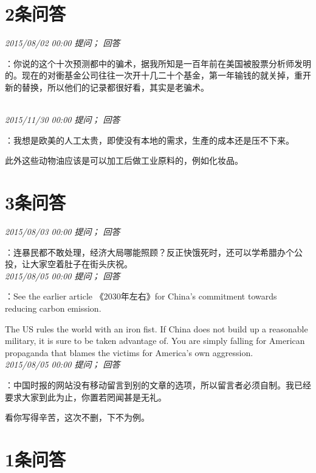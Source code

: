 \documentclass[twocolumn]{ctexart}
\begin{document}
\section{2条问答}

\textit{\hfill\noindent\small 2015/08/02 00:00 提问； 回答}

：你说的这个十次预测都中的骗术，据我所知是一百年前在美国被股票分析师发明的。现在的对衝基金公司往往一次开十几二十个基金，第一年输钱的就关掉，重开新的替换，所以他们的记录都很好看，其实是老骗术。

\\

\textit{\hfill\noindent\small 2015/11/30 00:00 提问； 回答}

：我想是欧美的人工太贵，即使没有本地的需求，生產的成本还是压不下来。

此外这些动物油应该是可以加工后做工业原料的，例如化妆品。\\

\section{3条问答}

\textit{\hfill\noindent\small 2015/08/03 00:00 提问； 回答}

：连暴民都不敢处理，经济大局哪能照顾？反正快饿死时，还可以学希腊办个公投，让大家空着肚子在街头庆祝。\\

\textit{\hfill\noindent\small 2015/08/05 00:00 提问； 回答}

：See the earlier article 《2030年左右》for China's commitment towards reducing carbon emission.

The US rules the world with an iron fist. If China does not build up a reasonable military, it is sure to be taken advantage of. You are simply falling for American propaganda that blames the victims for America's own aggression.\\

\textit{\hfill\noindent\small 2015/08/05 00:00 提问； 回答}

：中国时报的网站没有移动留言到别的文章的选项，所以留言者必须自制。我已经要求大家到此为止，你置若罔闻甚是无礼。

看你写得辛苦，这次不删，下不为例。\\

\section{1条问答}
\end{document}
